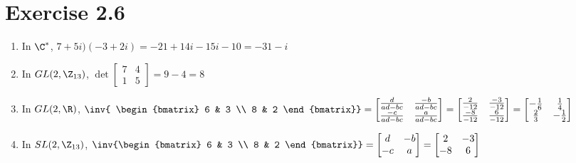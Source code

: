 \documentclass{article}
\begin{document}
\section*{Exercise 2.6}
\begin{enumerate}[label=\alph*)]
    \item In \(\C^*\), \(7+5i)(-3+2i) = -21+14i-15i-10 = -31-i\)
    \item In \(GL(2, \Z_{13})\), \(\det\begin{bmatrix}
        7 & 4 \\ 1 & 5
    \end{bmatrix}=9-4=8\)
    \item In \(GL(2, \R)\), \(\inv{
        \begin{bmatrix}
            6 & 3 \\ 8 & 2
        \end{bmatrix}}=\begin{bmatrix}
            \frac{d}{ad-bc} & \frac{-b}{ad-bc} \\
            \frac{-c}{ad-bc} & \frac{a}{ad-bc}
        \end{bmatrix}=\begin{bmatrix}
            \frac{2}{-12} & \frac{-3}{-12} \\
            \frac{-8}{-12} & \frac{6}{-12}
        \end{bmatrix}=\begin{bmatrix}
            -\frac{1}{6} & \frac{1}{4} \\
            \frac{2}{3} & -\frac{1}{2}
        \end{bmatrix}\)
    \item In \(SL(2, \Z_{13})\), \(\inv{\begin{bmatrix}
        6 & 3 \\ 8 & 2
    \end{bmatrix}}=\begin{bmatrix}
        d & -b \\ -c & a
    \end{bmatrix}=\begin{bmatrix}
        2 & -3 \\ -8 & 6
    \end{bmatrix}\)
\end{enumerate}
\end{document}
